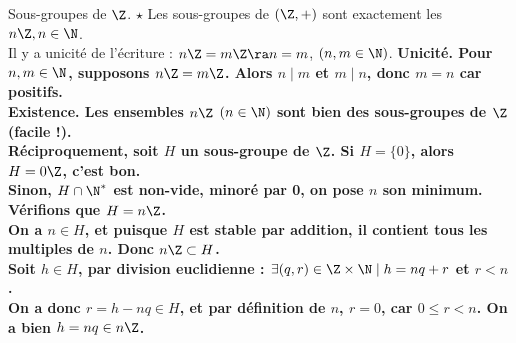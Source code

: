 \documentclass[11pt]{article}
\begin{document}
\begin{thm}{Sous-groupes de $\Z$. $\star$}{}
    Les sous-groupes de $(\Z,+)$ sont exactement les $n\Z,n\in\N$.\\
    Il y a unicité de l'écriture : $n\Z=m\Z\ra n=m$, $(n,m\in\N)$.
    \tcblower
    \bf{Unicité.} Pour $n,m\in\N$, supposons $n\Z=m\Z$. Alors $n\mid m$ et $m\mid n$, donc $m=n$ car positifs.\\
    \bf{Existence.} Les ensembles $n\Z$ $(n\in\N)$ sont bien des sous-groupes de $\Z$ (facile !).\\
    Réciproquement, soit $H$ un sous-groupe de $\Z$. Si $H=\{0\}$, alors $H=0\Z$, c'est bon.\\
    Sinon, $H\cap\N^*$ est non-vide, minoré par 0, on pose $n$ son minimum. Vérifions que $H=n\Z$.\\
    \boxed{\supset} On a $n\in H$, et puisque $H$ est stable par addition, il contient tous les multiples de $n$. Donc $n\Z\subset H$.\\
    \boxed{\subset} Soit $h\in H$, par \bf{division euclidienne} : $\exists (q,r)\in\Z\times\N \mid h = nq+r$ et $r<n$.\\
    On a donc $r=h-nq\in H$, et par définition de $n$, $r=0$, car $0\leq r<n$. On a bien $h=nq\in n\Z$.
\end{thm}
\end{document}
